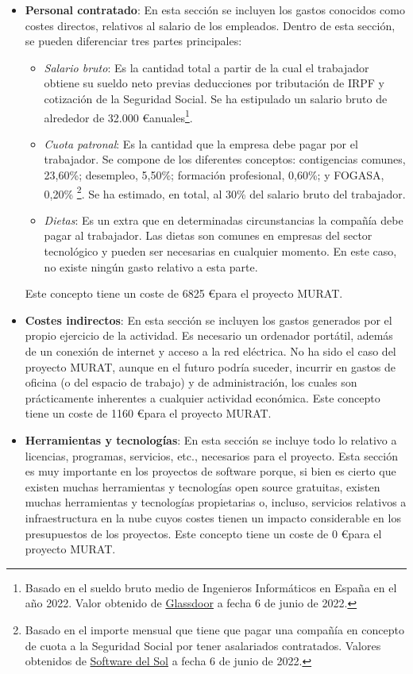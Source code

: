 \begin{itemize}
    \item \textbf{Personal contratado}: En esta sección se incluyen los gastos conocidos como costes directos, relativos al salario de los empleados. Dentro de esta sección, se pueden diferenciar tres partes principales:
    \begin{itemize}
        \item \textit{Salario bruto}: Es la cantidad total a partir de la cual el trabajador obtiene su sueldo neto previas deducciones por tributación de IRPF y cotización de la Seguridad Social. Se ha estipulado un salario bruto de alrededor de 32.000 \euro \space anuales\footnote{Basado en el sueldo bruto medio de Ingenieros Informáticos en España en el año 2022. Valor obtenido de \href{https://www.glassdoor.es/Sueldos/ingeniero-inform\%C3\%A1tico-sueldo-SRCH_KO0,21.htm}{Glassdoor} a fecha 6 de junio de 2022.}.
        \item \textit{Cuota patronal}: Es la cantidad que la empresa debe pagar por el trabajador. Se compone de los diferentes conceptos: contigencias comunes, 23,60\%; desempleo, 5,50\%; formación profesional, 0,60\%; y FOGASA, 0,20\% \footnote{Basado en el importe mensual que tiene que pagar una compañía en concepto de cuota a la Seguridad Social por tener asalariados contratados. Valores obtenidos de \href{https://www.sdelsol.com/glosario/cuota-patronal/}{Software del Sol} a fecha 6 de junio de 2022.}. Se ha estimado, en total, al 30\% del salario bruto del trabajador.
        \item \textit{Dietas}: Es un extra que en determinadas circunstancias la compañía debe pagar al trabajador. Las dietas son comunes en empresas del sector tecnológico y pueden ser necesarias en cualquier momento. En este caso, no existe ningún gasto relativo a esta parte.
    \end{itemize}
    Este concepto tiene un coste de 6825 \euro \space para el proyecto MURAT.
    \item \textbf{Costes indirectos}: En esta sección se incluyen los gastos generados por el propio ejercicio de la actividad. Es necesario un ordenador portátil, además de un conexión de internet y acceso a la red eléctrica. No  ha sido el caso del proyecto MURAT, aunque en el futuro podría suceder, incurrir en gastos de oficina (o del espacio de trabajo) y de administración, los cuales son prácticamente inherentes a cualquier actividad económica. Este concepto tiene un coste de 1160 \euro \space para el proyecto MURAT.
    \item \textbf{Herramientas y tecnologías}: En esta sección se incluye todo lo relativo a licencias, programas, servicios, etc., necesarios para el proyecto. Esta sección es muy importante en los proyectos de software porque, si bien es cierto que existen muchas herramientas y tecnologías open source gratuitas, existen muchas herramientas y tecnologías propietarias o, incluso, servicios relativos a infraestructura en la nube cuyos costes tienen un impacto considerable en los presupuestos de los proyectos. Este concepto tiene un coste de 0 \euro \space para el proyecto MURAT.
\end{itemize}

